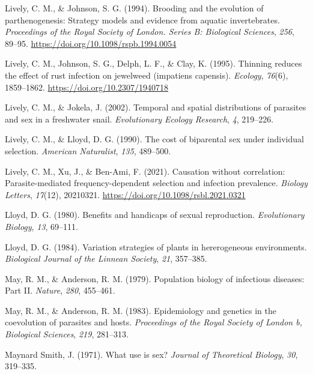 \documentclass[
  letterpaper,
]{book}
\newlength{\cslhangindent}
\newlength{\cslentryspacingunit} %
\newenvironment{CSLReferences}[2] %
 {%
  \setlength{\parindent}{0pt}
  \ifodd #1
  \let\oldpar\par
  \def\par{\hangindent=\cslhangindent\oldpar}
  \fi
  \setlength{\parskip}{#2\cslentryspacingunit}
 }%
 {}
\begin{document}
\begin{CSLReferences}{1}{0}
\leavevmode{}%
Lively, C. M., \& Johnson, S. G. (1994). Brooding and the evolution of
parthenogenesis: Strategy models and evidence from aquatic
invertebrates. \emph{Proceedings of the Royal Society of London. Series
B: Biological Sciences}, \emph{256}, 89--95.
\url{https://doi.org/10.1098/rspb.1994.0054}

\leavevmode{}%
Lively, C. M., Johnson, S. G., Delph, L. F., \& Clay, K. (1995).
Thinning reduces the effect of rust infection on jewelweed (impatiens
capensis). \emph{Ecology}, \emph{76}(6), 1859--1862.
\url{https://doi.org/10.2307/1940718}

\leavevmode{}%
Lively, C. M., \& Jokela, J. (2002). Temporal and spatial distributions
of parasites and sex in a freshwater snail. \emph{Evolutionary Ecology
Research}, \emph{4}, 219--226.

\leavevmode{}%
Lively, C. M., \& Lloyd, D. G. (1990). The cost of biparental sex under
individual selection. \emph{American Naturalist}, \emph{135}, 489--500.

\leavevmode{}%
Lively, C. M., Xu, J., \& Ben-Ami, F. (2021). Causation without
correlation: Parasite-mediated frequency-dependent selection and
infection prevalence. \emph{Biology Letters}, \emph{17}(12), 20210321.
\url{https://doi.org/10.1098/rsbl.2021.0321}

\leavevmode{}%
Lloyd, D. G. (1980). Benefits and handicaps of sexual reproduction.
\emph{Evolutionary Biology}, \emph{13}, 69--111.

\leavevmode{}%
Lloyd, D. G. (1984). Variation strategies of plants in hererogeneous
environments. \emph{Biological Journal of the Linnean Society},
\emph{21}, 357--385.

\leavevmode{}%
May, R. M., \& Anderson, R. M. (1979). Population biology of infectious
diseases: Part II. \emph{Nature}, \emph{280}, 455--461.

\leavevmode{}%
May, R. M., \& Anderson, R. M. (1983). Epidemiology and genetics in the
coevolution of parasites and hosts. \emph{Proceedings of the Royal
Society of London b, Biological Sciences}, \emph{219}, 281--313.

\leavevmode{}%
Maynard Smith, J. (1971). What use is sex? \emph{Journal of Theoretical
Biology}, \emph{30}, 319--335.


\end{CSLReferences}
\end{document}
